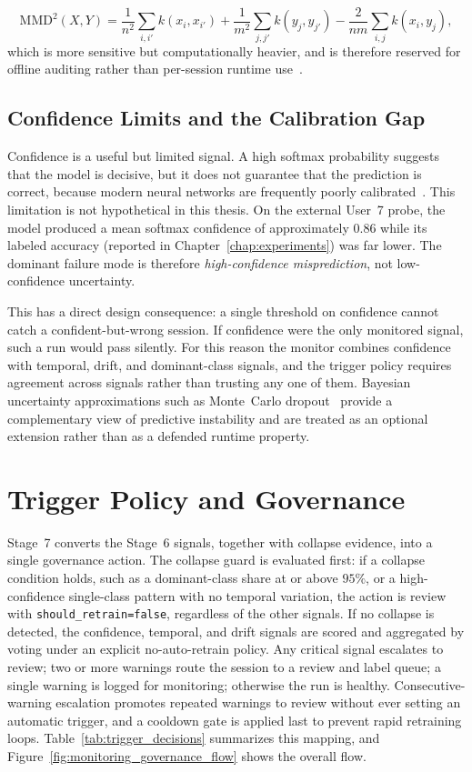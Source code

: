 \[
\mathrm{MMD}^2(X,Y)=\frac{1}{n^2}\sum_{i,i'}k(x_i,x_{i'})+\frac{1}{m^2}\sum_{j,j'}k(y_j,y_{j'})-\frac{2}{nm}\sum_{i,j}k(x_i,y_j),
\]
which is more sensitive but computationally heavier, and is therefore reserved for offline auditing rather than per-session runtime use~\cite{gretton2012kernel}.

\subsection{Confidence Limits and the Calibration Gap}
\label{sec:calibration_gap}

Confidence is a useful but limited signal. A high softmax probability suggests that the model is
decisive, but it does not guarantee that the prediction is correct, because modern neural networks
are frequently poorly calibrated~\cite{guo2017calibration,blasiok2024calibration}. This limitation is
not hypothetical in this thesis. On the external User~7 probe, the model produced a mean softmax
confidence of approximately \(0.86\) while its labeled accuracy (reported in
Chapter~\ref{chap:experiments}) was far lower. The dominant failure mode is therefore
\emph{high-confidence misprediction}, not low-confidence uncertainty.

This has a direct design consequence: a single threshold on confidence cannot catch a
confident-but-wrong session. If confidence were the only monitored signal, such a run would pass
silently. For this reason the monitor combines confidence with temporal, drift, and
dominant-class signals, and the trigger policy requires agreement across signals rather than trusting
any one of them. Bayesian uncertainty approximations such as Monte~Carlo dropout~\cite{gal2016dropout}
provide a complementary view of predictive instability and are treated as an optional extension rather
than as a defended runtime property.

\section{Trigger Policy and Governance}
\label{sec:trigger_policy}

Stage~7 converts the Stage~6 signals, together with collapse evidence, into a single governance
action. The collapse guard is evaluated first: if a collapse condition holds, such as a
dominant-class share at or above \(95\%\), or a high-confidence single-class pattern with no
temporal variation, the action is review with \texttt{should\_retrain=false}, regardless of the other
signals. If no collapse is detected, the confidence, temporal, and drift signals are scored and
aggregated by voting under an explicit no-auto-retrain policy. Any critical signal escalates to
review; two or more warnings route the session to a review and label queue; a single warning is
logged for monitoring; otherwise the run is healthy. Consecutive-warning escalation promotes repeated
warnings to review without ever setting an automatic trigger, and a cooldown gate is applied last to
prevent rapid retraining loops. Table~\ref{tab:trigger_decisions} summarizes this mapping, and
Figure~\ref{fig:monitoring_governance_flow} shows the overall flow.

